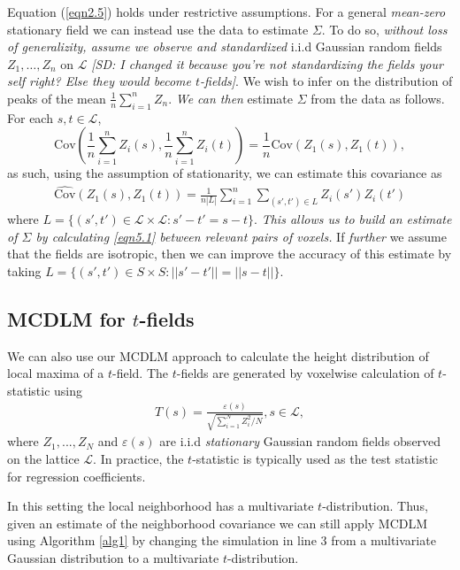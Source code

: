 \documentclass{article}
\newcommand{\Cov}{\mathrm{Cov}}
\newcommand{\sdcom}[1]{\textit{\color{red} [SD: #1]}}
\newcommand{\nt}[1]{\textit{\color{red} #1}}
\begin{document}
Equation (\ref{eqn2.5}) holds under restrictive assumptions. For a general \nt{mean-zero} stationary field we can instead use the data to estimate $\Sigma$. To do so, \nt{without loss of generalizity, assume we observe and standardized} i.i.d Gaussian random fields $Z_1, \dots, Z_n$ on $\mathcal{L}$ \sdcom{I changed it because you're not standardizing the fields your self right? Else they would become $t$-fields}. We wish to infer on the distribution of peaks of the mean $\frac{1}{n}\sum_{i = 1}^n Z_n$. \nt{We can then} estimate $\Sigma$ from the data as follows. For each $s, t \in \mathcal{L}$, 
\begin{equation}
  \Cov\left( \frac{1}{n} \sum_{i = 1}^n Z_i(s), \frac{1}{n} \sum_{i = 1}^n Z_i(t)\right) = \frac{1}{n}\Cov(Z_1(s), Z_1(t)),
\end{equation}
as such, using the assumption of stationarity, we can estimate this covariance as   
\begin{align}
    \widehat{\mathrm{Cov}}(Z_1(s), Z_1(t)) = \frac{1}{n|L|}\sum_{i=1}^n\sum_{(s',t')\in L}Z_i(s')Z_i(t') \label{eqn5.1}
\end{align}
where $L = \{(s', t') \in \mathcal{L} \times \mathcal{L}: s' - t' = s-t\}$. \nt{This allows us to build an estimate of $\Sigma$ by calculating \eqref{eqn5.1} between relevant pairs of voxels.} If \nt{further} we assume that the fields are isotropic, then we can improve the accuracy of this estimate by taking $L =  \{(s', t') \in S \times S: ||s' - t'|| = ||s-t||\}$.

\subsection{MCDLM for $t$-fields}
\label{sec2.4}
We can also use our MCDLM approach to calculate the height distribution of local maxima of a $t$-field. The $t$-fields are generated by voxelwise calculation of $t$-statistic using
\begin{align}
    T(s) = \frac{\varepsilon(s)}{\sqrt{\sum_{i=1}^N Z_i^2/N}}, s \in \mathcal{L},\label{eqn.t}
\end{align}
where $Z_1,...,Z_N$ and $\varepsilon(s)$ are i.i.d \nt{stationary} Gaussian random fields observed on the lattice $\mathcal{L}$. In practice, the $t$-statistic is typically used as the test statistic for regression coefficients. 

In this setting the local neighborhood has a multivariate $t$-distribution. Thus, given an estimate of the neighborhood covariance we can still apply MCDLM using Algorithm \ref{alg1} by changing the simulation in line 3 from a multivariate Gaussian distribution to a multivariate $t$-distribution.
\end{document}
